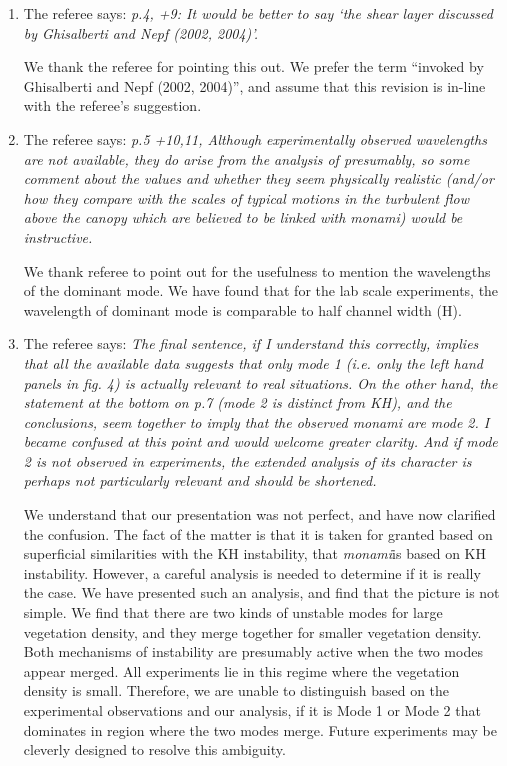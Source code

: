 \documentclass[letterpaper,10pt]{article}
\newcommand{\monami}{\textit{monami}}
\begin{document}
\begin{enumerate}
\item The referee says:
\textit{
p.4, +9: It would be better to say ‘the shear layer discussed by Ghisalberti and Nepf (2002, 2004)’.
}

We thank the referee for pointing this out. We prefer the term ``invoked by Ghisalberti and Nepf (2002, 2004)'', and assume that this revision is in-line with the referee's suggestion.

\item The referee says:
\textit{p.5 +10,11, Although experimentally observed wavelengths are not available, they do arise from the analysis of presumably, so some comment about the values and whether they seem physically realistic (and/or how they compare with the scales of typical motions in the turbulent flow above the canopy which are believed to be linked with monami) would be instructive.
}

We thank referee to point out for the usefulness to mention the wavelengths of the dominant mode. We have found that for the lab scale experiments, the wavelength of dominant mode is comparable to half channel width (H). 

\item The referee says:
\textit{
The final sentence, if I understand this correctly, implies that all the available data suggests that only mode 1 (i.e. only the left hand panels in fig. 4) is actually relevant to real situations. On the other hand, the statement at the bottom on p.7 (mode 2 is distinct from KH), and the conclusions, seem together to imply that the observed monami are mode 2. I became confused at this point and would welcome greater clarity. And if mode 2 is not observed in experiments, the extended analysis of its character is perhaps not particularly relevant and should be shortened.
}

We understand that our presentation was not perfect, and have now clarified the confusion. The fact of the matter is that it is taken for granted based on superficial similarities with the KH instability, that \monami is based on KH instability. However, a careful analysis is needed to determine if it is really the case. We have presented such an analysis, and find that the picture is not simple. We find that there are two kinds of unstable modes for large vegetation density, and they merge together for smaller vegetation density. Both mechanisms of instability are presumably active when the two modes appear merged. All experiments lie in this regime where the vegetation density is small. Therefore, we are unable to distinguish based on the experimental observations and our analysis, if it is Mode 1 or Mode 2 that dominates in region where the two modes merge. Future experiments may be cleverly designed to resolve this ambiguity.


\end{enumerate}
\end{document}
